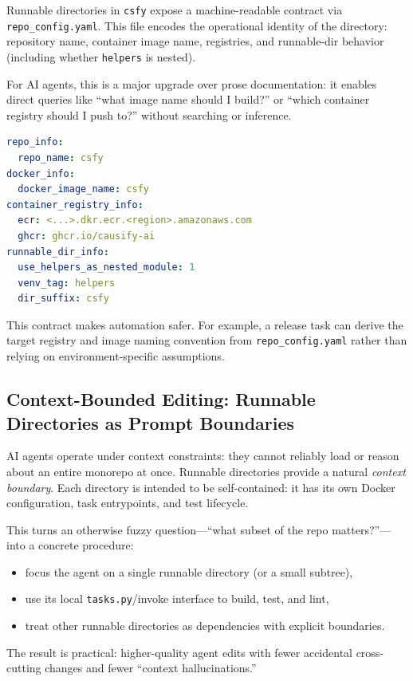 Runnable directories in \texttt{csfy} expose a machine-readable contract via
\texttt{repo\_config.yaml}. This file encodes the operational identity of the
directory: repository name, container image name, registries, and runnable-dir
behavior (including whether \texttt{helpers} is nested).

For AI agents, this is a major upgrade over prose documentation: it enables direct
queries like “what image name should I build?” or “which container registry should
I push to?” without searching or inference.

\begin{lstlisting}[language=YAML]
repo_info:
  repo_name: csfy
docker_info:
  docker_image_name: csfy
container_registry_info:
  ecr: <...>.dkr.ecr.<region>.amazonaws.com
  ghcr: ghcr.io/causify-ai
runnable_dir_info:
  use_helpers_as_nested_module: 1
  venv_tag: helpers
  dir_suffix: csfy
\end{lstlisting}

This contract makes automation safer. For example, a release task can derive the
target registry and image naming convention from \texttt{repo\_config.yaml} rather
than relying on environment-specific assumptions.

\subsection{Context-Bounded Editing: Runnable Directories as Prompt Boundaries}

AI agents operate under context constraints: they cannot reliably load or reason
about an entire monorepo at once. Runnable directories provide a natural
\emph{context boundary}. Each directory is intended to be self-contained: it has
its own Docker configuration, task entrypoints, and test lifecycle.

This turns an otherwise fuzzy question—“what subset of the repo matters?”—into a
concrete procedure:
\begin{itemize}
  \item focus the agent on a single runnable directory (or a small subtree),
  \item use its local \texttt{tasks.py}/invoke interface to build, test, and lint,
  \item treat other runnable directories as dependencies with explicit boundaries.
\end{itemize}

The result is practical: higher-quality agent edits with fewer accidental
cross-cutting changes and fewer “context hallucinations.”

